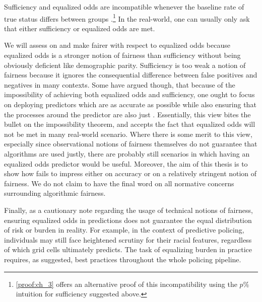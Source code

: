Sufficiency and equalized odds are incompatible whenever the baseline rate of true status differs between groups \citep{kleinberg_inherent_2016,chouldechova_fair_2017}.\footnote{\autoref{proof:ch_3} offers an alternative proof of this incompatibility using the $p\%$ intuition for sufficiency suggested above.} In the real-world, one can usually only ask that either sufficiency or equalized odds are met.

We will assess \pp on and make \pp fairer with respect to equalized odds because equalized odds is a stronger notion of fairness than sufficiency without being obviously deficient like demographic parity. Sufficiency is too weak a notion of fairness because it ignores the consequential difference between false positives and negatives in many contexts. Some have argued though, that because of the impossibility of achieving both  equalized odds and sufficiency, one ought to focus on deploying predictors which are as accurate as possible while also ensuring that the processes around the predictor are also just \citep{corbett-davies_algorithmic_2017}. Essentially, this view bites the bullet on the impossibility theorem, and accepts the fact that equalized odds will not be met in many real-world scenario. Where there is some merit to this view, especially since observational notions of fairness themselves do not guarantee that algorithms are used justly, there are probably still scenarios in which having an equalized odds predictor would be useful. Moreover, the aim of this thesis is to show how \pp fails to impress either on accuracy or on a relatively stringent notion of fairness. We do not claim to have the final word on all normative concerns surrounding algorithmic fairness.

Finally, as a cautionary note regarding the usage of technical notions of fairness, ensuring equalized odds in predictions does not guarantee the equal distribution of risk or burden in reality. For example, in the context of predictive policing, individuals may still face heightened scrutiny for their racial features, regardless of which grid cells \pp ultimately predicts. The task of equalizing burden in practice requires, as \citet{perry_predictive_2013} suggested, best practices throughout the whole policing pipeline.
